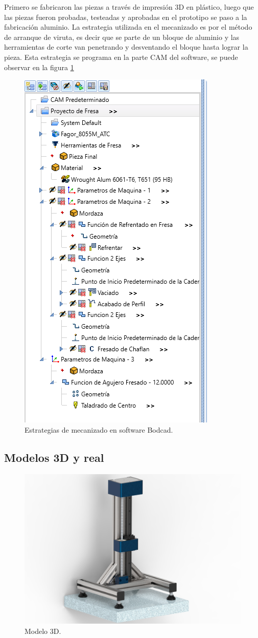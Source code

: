 Primero se fabricaron las piezas a través de impresión 3D en plástico, luego que las piezas fueron probadas, testeadas y aprobadas en el prototipo se paso a la fabricación aluminio.
La estrategia utilizada en el mecanizado es por el método de arranque de viruta, es decir que se parte de un bloque de aluminio y las herramientas de corte van penetrando y desventando el bloque hasta lograr la pieza. Esta estrategia se programa en la parte CAM del software, se puede observar en la figura \ref{fig:estrategia}

\begin{figure}[ht]
	\centering
	\includegraphics[width=.5\textwidth]{./Figures/3d_estrategia.png}
	\caption{Estrategias de mecanizado en software Bodcad.}
	\label{fig:estrategia}
\end{figure}



\subsection{Modelos 3D y real}

\begin{figure}[ht]
	\centering
	\includegraphics[width=.8\textwidth]{./Figures/3d.jpg}
	\caption{Modelo 3D.}
	\label{fig:mecanica_3d_model}
\end{figure}

